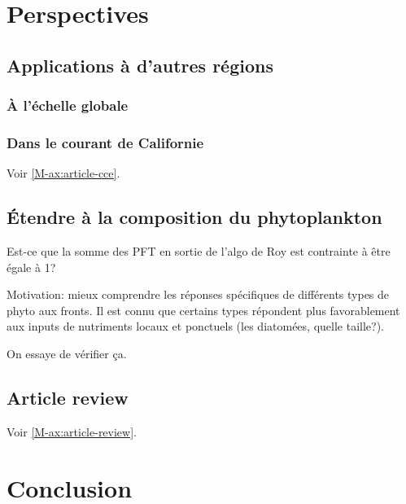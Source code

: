 \documentclass[index]{subfiles}
\begin{document}
\chapter{Perspectives}
\label{chp:perspectives}

\tocsubfile

\section{Applications à d'autres régions}
\label{sec:appl-autres-regions}

\subsection{À l'échelle globale}
\label{sec:global}

\subsection{Dans le courant de Californie}
\label{sec:CCE}

Voir \cref{M-ax:article-cce}.

\section{Étendre à la composition du phytoplankton}
\label{sec:persp-pft}

Est-ce que la somme des PFT en sortie de l'algo de Roy est contrainte à être égale à 1?

Motivation: mieux comprendre les réponses spécifiques de différents types de phyto aux fronts.
Il est connu que certains types répondent plus favorablement aux inputs de nutriments locaux et ponctuels (les diatomées, quelle taille?).

On essaye de vérifier ça.

\section{Article review}
Voir \cref{M-ax:article-review}.

\chapter{Conclusion}
\label{chp:conclusion}
\end{document}
